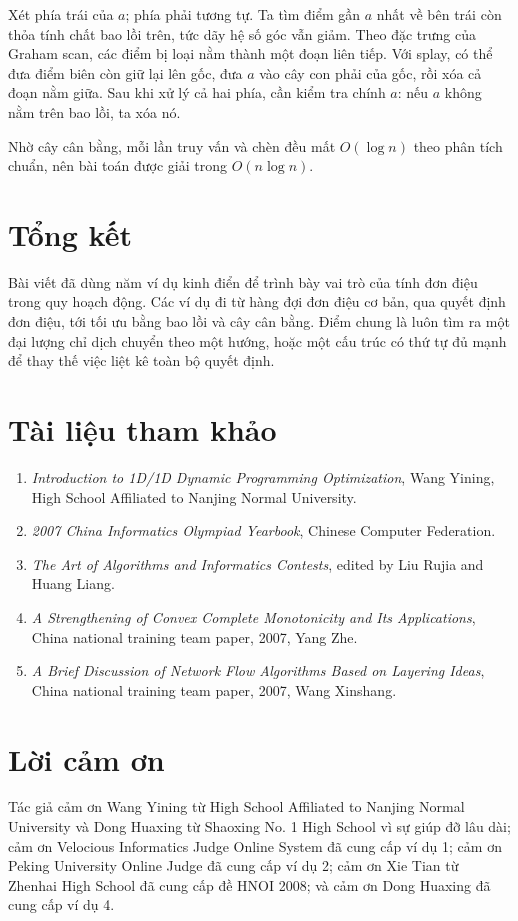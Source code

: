 \documentclass[11pt]{article}
\begin{document}
Xét phía trái của $a$; phía phải tương tự. Ta tìm điểm gần $a$ nhất về bên
trái còn thỏa tính chất bao lồi trên, tức dãy hệ số góc vẫn giảm. Theo đặc
trưng của Graham scan, các điểm bị loại nằm thành một đoạn liên tiếp. Với
splay, có thể đưa điểm biên còn giữ lại lên gốc, đưa $a$ vào cây con phải
của gốc, rồi xóa cả đoạn nằm giữa. Sau khi xử lý cả hai phía, cần kiểm tra
chính $a$: nếu $a$ không nằm trên bao lồi, ta xóa nó.

Nhờ cây cân bằng, mỗi lần truy vấn và chèn đều mất $O(\log n)$ theo phân tích
chuẩn, nên bài toán được giải trong $O(n\log n)$.

\section*{Tổng kết}

Bài viết đã dùng năm ví dụ kinh điển để trình bày vai trò của tính đơn điệu
trong quy hoạch động. Các ví dụ đi từ hàng đợi đơn điệu cơ bản, qua quyết
định đơn điệu, tới tối ưu bằng bao lồi và cây cân bằng. Điểm chung là luôn
tìm ra một đại lượng chỉ dịch chuyển theo một hướng, hoặc một cấu trúc có thứ
tự đủ mạnh để thay thế việc liệt kê toàn bộ quyết định.

\section*{Tài liệu tham khảo}

\begin{enumerate}
  \item \emph{Introduction to 1D/1D Dynamic Programming Optimization}, Wang
  Yining, High School Affiliated to Nanjing Normal University.
  \item \emph{2007 China Informatics Olympiad Yearbook}, Chinese Computer
  Federation.
  \item \emph{The Art of Algorithms and Informatics Contests}, edited by Liu
  Rujia and Huang Liang.
  \item \emph{A Strengthening of Convex Complete Monotonicity and Its
  Applications}, China national training team paper, 2007, Yang Zhe.
  \item \emph{A Brief Discussion of Network Flow Algorithms Based on Layering
  Ideas}, China national training team paper, 2007, Wang Xinshang.
\end{enumerate}

\section*{Lời cảm ơn}

Tác giả cảm ơn Wang Yining từ High School Affiliated to Nanjing Normal
University và Dong Huaxing từ Shaoxing No. 1 High School vì sự giúp đỡ lâu
dài; cảm ơn Velocious Informatics Judge Online System đã cung cấp ví dụ 1;
cảm ơn Peking University Online Judge đã cung cấp ví dụ 2; cảm ơn Xie Tian từ
Zhenhai High School đã cung cấp đề HNOI 2008; và cảm ơn Dong Huaxing đã cung
cấp ví dụ 4.
\end{document}
